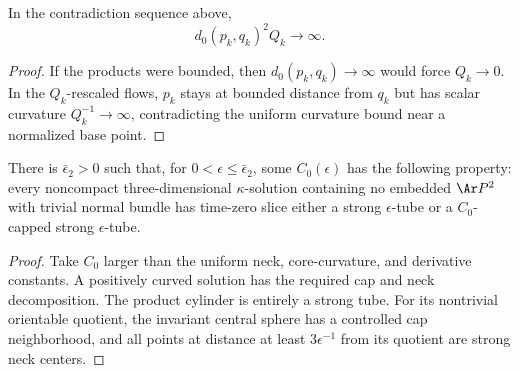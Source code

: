 \begin{claim}\label{claim:kq-scale-separation}
In the contradiction sequence above,
\[
 d_0(p_k,q_k)^2Q_k\longrightarrow\infty.
\]
\end{claim}
\begin{proof}
\sketch
{}
If the products were bounded, then $d_0(p_k,q_k)\to\infty$ would
force $Q_k\to0$. In the $Q_k$-rescaled flows, $p_k$ stays at bounded
distance from $q_k$ but has scalar curvature $Q_k^{-1}\to\infty$,
contradicting the uniform curvature bound near a normalized base
point.
\end{proof}

\begin{corollary}\label{cor:noncompact-kappa-solution-tube-structure}
\label{noncompkappa}
There is $\bar\epsilon_2>0$ such that, for
$0<\epsilon\leq\bar\epsilon_2$, some $C_0(\epsilon)$ has the
following property: every noncompact three-dimensional
$\kappa$-solution containing no embedded $\Ar P^2$ with trivial
normal bundle has time-zero slice either a strong $\epsilon$-tube
or a $C_0$-capped strong $\epsilon$-tube.
\end{corollary}
\begin{proof}
\sketch
{}
Take $C_0$ larger than the uniform neck, core-curvature, and
derivative constants. A positively curved solution has the required
cap and neck decomposition. The product cylinder is entirely a
strong tube. For its nontrivial orientable quotient, the invariant
central sphere has a controlled cap neighborhood, and all points at
distance at least $3\epsilon^{-1}$ from its quotient are strong neck
centers.
\end{proof}

